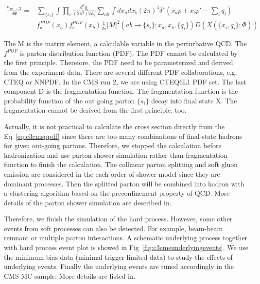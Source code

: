 \begin{equation}
  \begin{split}
		\frac{\sigma_{pp \rightarrow X}}{d\Phi}=& \sum_{\{s_{i}\}} \int \prod_{i} \frac{d^{3}q_{i}}{(2\pi^{3})2E_{i}} \sum_{ab} \int dx_{a}dx_{b}(2\pi)^{4}\delta^{4}(x_{a}p+x_{b}p\prime-\sum_{i}q_{i}) \\
	                                          & f_{a}^{PDF}(x_{a})f_{b}^{PDF}(x_{b}) \frac{1}{2\hat{s}}|M|^{2}(ab \rightarrow \{s_{i}\};x_{a},x_{b},\{q_{i}\}) D(X(\{x_{i},q_{i}\};\Phi))
  \end{split}
 \label{eq:c3cmsppdf}
\end{equation}

The M is the matrix element, a calculable variable in the perturbative QCD. The $f^{PDF}$ is parton distribution function (PDF)\cite{Butterworth:2015oua}. The PDF cannot be calculated by the first principle. Therefore, the PDF need to be parameterized and derived from the experiment data. There are several different PDF collaborations, e.g. CTEQ or NNPDF. In the CMS run 2, we are using CTEQ6L1 PDF set. The last component D is the fragmentation function. The fragmentation function is the probability function of the out going parton $\{s_{i}\}$ decay into final state X. The fragmentation cannot be derived from the first principle, too. 

Actually, it is not practical to calculate the cross section directly from the Eq~\ref{eq:c3cmsppdf} since there are too many combinations of final-state hadrons for given out-going partons. Therefore, we stopped the calculation before hadronization and use parton shower simulation rather than fragmentation function to finish the calculation. The collinear parton splitting and soft gluon emission are considered in the each order of shower model since they are dominant processes. Then the splitted parton will be combined into hadron with a clustering algorithm based on the preconfinement property of QCD\cite{Amati:1979fg}. More details of the parton shower simulation are described in\cite{Hoche:2014rga}.

Therefore, we finish the simulation of the hard process. However, some other events from soft processes can also be detected. For example, beam-beam remnant or multiple parton interactions. A schematic underlying process together with hard process event plot is showed in Fig~\ref{fig:c3cmsunderlyingevents}. We use the minimum bias data (minimal trigger limited data) to study the effects of underlying events. Finally the underlying events are tuned accordingly in the CMS MC sample. More details are listed in\cite{Field:1393621}. 

